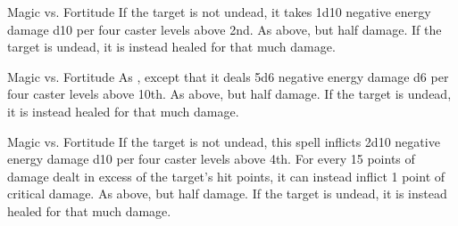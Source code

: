 \begin{spellheader}
    \spellrng{\rngclose}
\end{spellheader}
\begin{spelleffects}
    \begin{spellattack}{Magic vs. Fortitude}
        \spellsuccess If the target is not undead, it takes 1d10 negative energy damage \add d10 per four caster levels above 2nd.
        \spellfailure As above, but half damage.
        \spelleffect If the target is undead, it is instead healed for that much damage.
    \end{spellattack}
\end{spelleffects}
\begin{spellfooter}

\end{spellfooter}

\begin{spellheader}
\end{spellheader}
\begin{spelleffects}
    \begin{spellattack}{Magic vs. Fortitude}
        \spellsuccess As , except that it deals 5d6 negative energy damage \add d6 per four caster levels above 10th.
        \spellfailure As above, but half damage.
        \spelleffect If the target is undead, it is instead healed for that much damage.
    \end{spellattack}
\end{spelleffects}
\begin{spellfooter}

\end{spellfooter}

\begin{spellheader}
    \spellrng{\rngclose}
\end{spellheader}
\begin{spelleffects}
    \begin{spellattack}{Magic vs. Fortitude}
        \spellsuccess If the target is not undead, this spell inflicts 2d10 negative energy damage \add d10 per four caster levels above 4th. For every 15 points of damage dealt in excess of the target's hit points, it can instead inflict 1 point of critical damage.
        \spellfailure As above, but half damage.
        \spelleffect If the target is undead, it is instead healed for that much damage.
    \end{spellattack}
\end{spelleffects}
\begin{spellfooter}

\end{spellfooter}

